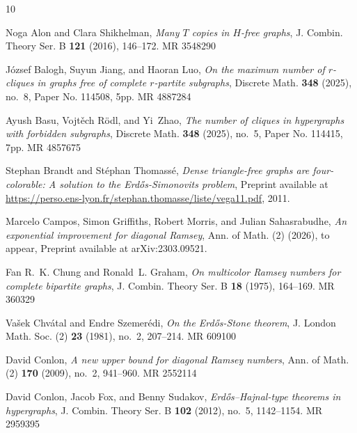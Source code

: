 \providecommand{\bysame}{\leavevmode\hbox to3em{\hrulefill}\thinspace}
\providecommand{\MR}{\relax\ifhmode\unskip\space\fi MR }
\providecommand{\MRhref}[2]{%
  \href{http://www.ams.org/mathscinet-getitem?mr=#1}{#2}
}
\providecommand{\href}[2]{#2}
\begin{thebibliography}{10}

Noga Alon and Clara Shikhelman, \emph{Many {$T$} copies in {$H$}-free graphs},
  J. Combin. Theory Ser. B \textbf{121} (2016), 146--172. \MR{3548290}

J\'ozsef Balogh, Suyun Jiang, and Haoran Luo, \emph{On the maximum number of
  {$r$}-cliques in graphs free of complete {$r$}-partite subgraphs}, Discrete
  Math. \textbf{348} (2025), no.~8, Paper No. 114508, 5pp. \MR{4887284}

Ayush Basu, Vojt\v{e}ch R\"odl, and Yi~Zhao, \emph{The number of cliques in
  hypergraphs with forbidden subgraphs}, Discrete Math. \textbf{348} (2025),
  no.~5, Paper No. 114415, 7pp. \MR{4857675}

Stephan Brandt and St\'ephan Thomass\'e, \emph{Dense triangle-free graphs are
  four-colorable: {A} solution to the {Erd\H{o}s}-{S}imonovits problem},
  Preprint available at
  \url{https://perso.ens-lyon.fr/stephan.thomasse/liste/vega11.pdf}, 2011.

Marcelo Campos, Simon Griffiths, Robert Morris, and Julian Sahasrabudhe,
  \emph{An exponential improvement for diagonal {R}amsey}, Ann. of Math. (2)
  (2026), to appear, Preprint available at arXiv:2303.09521.

Fan R.~K. Chung and Ronald~L. Graham, \emph{On multicolor {R}amsey numbers for
  complete bipartite graphs}, J. Combin. Theory Ser. B \textbf{18} (1975),
  164--169. \MR{360329}

Va\v{s}ek Chv\'{a}tal and Endre Szemer\'{e}di, \emph{On the {Erd\H{o}s}-{S}tone
  theorem}, J. London Math. Soc. (2) \textbf{23} (1981), no.~2, 207--214.
  \MR{609100}

David Conlon, \emph{A new upper bound for diagonal {R}amsey numbers}, Ann. of
  Math. (2) \textbf{170} (2009), no.~2, 941--960. \MR{2552114}

David Conlon, Jacob Fox, and Benny Sudakov, \emph{{Erd\H os}--{H}ajnal-type
  theorems in hypergraphs}, J. Combin. Theory Ser. B \textbf{102} (2012),
  no.~5, 1142--1154. \MR{2959395}


\end{thebibliography}
